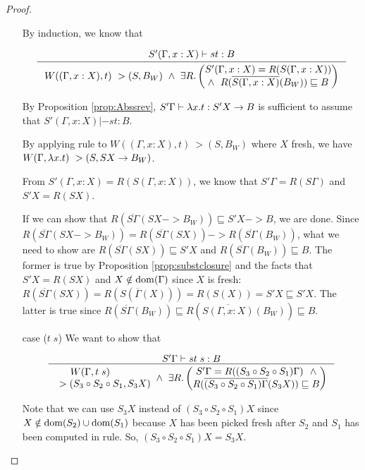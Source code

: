 \begin{proof}
\begin{itemize}
	By induction, we know that  \vspace*{-2em}
	\begin{singlespace}
	\[\inference{S'(\Gamma,x:X) |-s t : B}{
	W((\Gamma, x:X),t) ~> (S,B_W) ~\land~
	\exists R.
		\left(\begin{matrix}
			S'(\Gamma,x:X)=R(S(\Gamma,x:X)) \\ \land~\;
			R(\overline{S(\Gamma,x:X)}(B_W))\sqsubseteq B
		\end{matrix}\right) } \]
	\end{singlespace}

	By Proposition \ref{prop:Abssrev},
	$S'\Gamma |- \lambda x.t : S'X -> B$ is sufficient to assume that
	$S'(\Gamma,x:X) |-s t:B$.

	By applying  rule to
	$W((\Gamma, x:X),t) ~> (S,B_W)$ where $X$ fresh,
	we have $W(\Gamma,\lambda x.t) ~> (S,S X -> B_W)$.

	From $S'(\Gamma,x:X)=R(S(\Gamma,x:X))$, we know that
	$S'\Gamma = R(S\Gamma)$ and $S'X = R(S X)$.

	If we can show that
	$R(\overline{S\Gamma}(S X -> B_W)) \sqsubseteq S'X -> B$,
	we are done. Since
	$R(\overline{S\Gamma}(S X -> B_W)) =
	R(\overline{S\Gamma}(S X)) -> R(\overline{S\Gamma}(B_W))$,
	what we need to show are
	$R(\overline{S\Gamma}(S X))\sqsubseteq S'X$ and
	$R(\overline{S\Gamma}(B_W)) \sqsubseteq B$.
	The former is true by Proposition \ref{prop:substclosure} and
	the facts that $S'X = R(S X)$ and
	$X\notin \mathop{\mathrm{dom}}(\Gamma)$ since $X$ is fresh:
	$R(\overline{S\Gamma}(S X)) =
	R(S(\overline{\Gamma}(X))) = R(S(X)) = S'X
	\sqsubseteq S' X$.
	The latter is true since $ R(\overline{S\Gamma}(B_W)) 
	\sqsubseteq R(\overline{S(\Gamma,x:X)}(B_W)) \sqsubseteq B$.

\item[case]($t\;s$)
	We want to show that \vspace*{-2em}
	\begin{singlespace}
	\[\inference{S'\Gamma |-s t\;s : B}{
	\begin{matrix} W(\Gamma,t\;s) ~\qquad~ \\
		~> (S_3\circ S_2\circ S_1,S_3 X) \end{matrix}
	~\land~
	\exists R.
		\left(\begin{matrix}
			S'\Gamma=R((S_3\circ S_2\circ S_1)\Gamma) ~~ \land \\
			R(\overline{(S_3\circ S_2\circ S_1)\Gamma}(S_3 X))
			\sqsubseteq B
		\end{matrix}\right) } \]
	\end{singlespace}
	Note that we can use $S_3 X$ instead of $(S_3\circ S_2\circ S_1) X$
	since $X\notin\mathop{\mathrm{dom}}(S_2)\cup\mathop{\mathrm{dom}}(S_1)$ because
	$X$ has been picked fresh after $S_2$ and $S_1$ has been computed
	in  rule. So, $(S_3\circ S_2\circ S_1) X = S_3 X$.
	

\end{itemize}
\end{proof}
